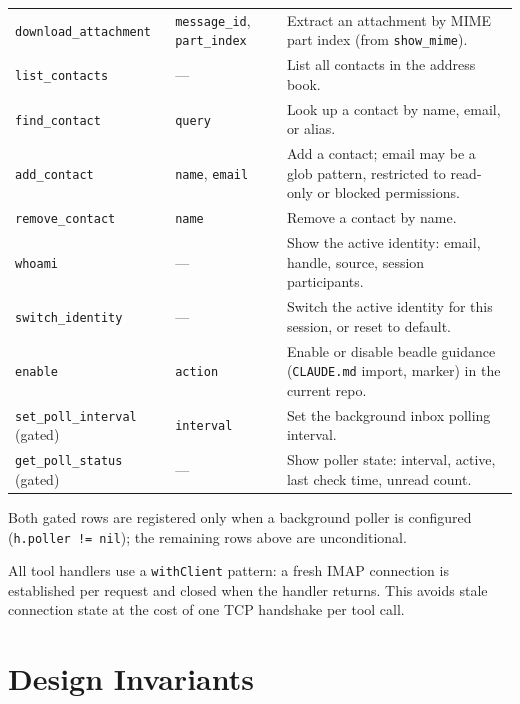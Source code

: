 \documentclass[a4paper,10pt,fleqn]{article}
\begin{document}
\begin{center}
\begin{longtable}{@{}llp{6cm}@{}}
\texttt{download\_attachment} & \texttt{message\_id}, \texttt{part\_index} & Extract an attachment by MIME part index (from \texttt{show\_mime}). \\
\texttt{list\_contacts}       & ---                            & List all contacts in the address book. \\
\texttt{find\_contact}        & \texttt{query}                 & Look up a contact by name, email, or alias. \\
\texttt{add\_contact}         & \texttt{name}, \texttt{email}  & Add a contact; email may be a glob pattern, restricted to read-only or blocked permissions. \\
\texttt{remove\_contact}      & \texttt{name}                  & Remove a contact by name. \\
\texttt{whoami}               & ---                            & Show the active identity: email, handle, source, session participants. \\
\texttt{switch\_identity}     & ---                            & Switch the active identity for this session, or reset to default. \\
\texttt{enable}               & \texttt{action}                & Enable or disable beadle guidance (\texttt{CLAUDE.md} import, marker) in the current repo. \\
\texttt{set\_poll\_interval} (gated) & \texttt{interval}         & Set the background inbox polling interval. \\
\texttt{get\_poll\_status} (gated)   & ---                       & Show poller state: interval, active, last check time, unread count. \\
\bottomrule
\end{longtable}
\end{center}

Both gated rows are registered only when a background poller is
configured (\texttt{h.poller != nil}); the remaining rows above are
unconditional.

All tool handlers use a \texttt{withClient} pattern: a fresh IMAP
connection is established per request and closed when the handler
returns.  This avoids stale connection state at the cost of one
TCP handshake per tool call.

\section{Design Invariants}
\end{document}
